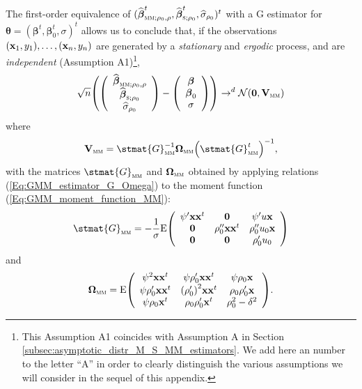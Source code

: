 The first-order equivalence of $(\sthat{\boldsymbol\beta}_{\stsc{MM}%
;\rho_{0},\rho}^{t},\sthat{\boldsymbol\beta}_{\stsc{S};\rho_{0}}%
^{t},\sthat{\sigma}_{\rho_{0}})^{t}$ with a G estimator for
$\boldsymbol{\theta}=(\boldsymbol\beta^{t},\boldsymbol\beta_{0}^{t}%
,\sigma)^{t}$ allows us to conclude that, if the observations $\left(
\stvec{x}_{1},y_{1}\right)  ,\ldots,\left(  \stvec{x}_{n},y_{n}\right)  $
are generated by a \emph{stationary} and \emph{ergodic} process, and are
\emph{independent} (Assumption A1)\footnote{This Assumption A1 coincides
with Assumption A in Section \ref{subsec:asymptotic_distr_M_S_MM_estimators}.
We add here an number to the letter “A” in order to clearly distinguish the
various assumptions we will consider in the sequel of this appendix.},
\[
\sqrt{n}\left(  \left(
\begin{array}
[c]{c}%
\sthat{\boldsymbol\beta}_{\stsc{MM};\rho_{0},\rho}\\
\sthat{\boldsymbol\beta}_{\stsc{S};\rho_{0}}\\
\sthat{\sigma}_{\rho_{0}}%
\end{array}
\right)  -\left(
\begin{array}
[c]{c}%
\boldsymbol\beta\\
\boldsymbol\beta_{0}\\
\sigma
\end{array}
\right)  \right)  \rightarrow^{d}\mathcal{N}(\stvec{0},\mathbf{V}%
_{\stsc{MM}})
\]
where
\[
\mathbf{V}_{\stsc{MM}}=\stmat{G}_{\stsc{MM}}^{-1}\boldsymbol{\Omega
}_{\stsc{MM}}\left(  \stmat{G}_{\stsc{MM}}^{t}\right)  ^{-1},
\]
with the matrices $\stmat{G}_{\stsc{MM}}$ and $\boldsymbol{\Omega
}_{\stsc{MM}}$ obtained by applying relations
(\ref{Eq:GMM_estimator_G_Omega}) to the moment function
(\ref{Eq:GMM_moment_function_MM}):
\[
\stmat{G}_{\stsc{MM}}=-\frac{1}{\sigma}\mathrm{E}\left(
\begin{array}
[c]{ccc}%
\psi^{\prime}\mathbf{xx}^{t} & \stvec{0} & \psi^{\prime}u\stvec{x}\\
\stvec{0} & \rho_{0}^{\prime\prime}\mathbf{xx}^{t} & \rho_{0}^{\prime\prime
}u_{0}\stvec{x}\\
\stvec{0} & \stvec{0} & \rho_{0}^{\prime}u_{0}%
\end{array}
\right)
\]
and
\[
\boldsymbol{\Omega}_{\stsc{MM}}=\mathrm{E}\left(
\begin{array}
[c]{ccc}%
\psi^{2}\mathbf{xx}^{t} & \psi\rho_{0}^{\prime}\mathbf{xx}^{t} & \psi\rho
_{0}\stvec{x}\\
\psi\rho_{0}^{\prime}\mathbf{xx}^{t} & \left(  \rho_{0}^{\prime}\right)
^{2}\mathbf{xx}^{t} & \rho_{0}\rho_{0}^{\prime}\stvec{x}\\
\psi\rho_{0}\stvec{x}^{t} & \rho_{0}\rho_{0}^{\prime}\stvec{x}^{t} &
\rho_{0}^{2}-\delta^{2}%
\end{array}
\right)  .
\]
